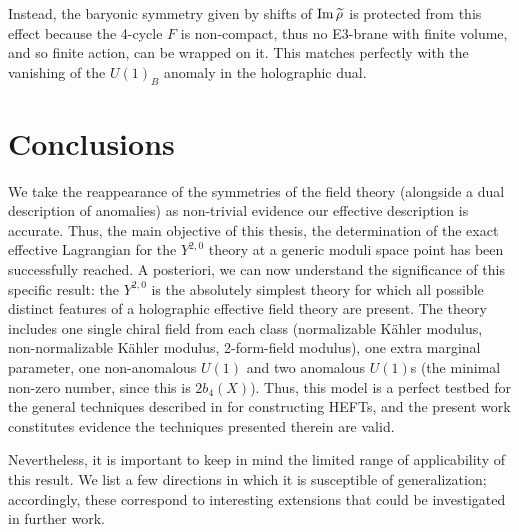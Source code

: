 Instead, the baryonic symmetry given by shifts of $\operatorname{Im}\widetilde{\rho}$ is protected from this effect because the 4-cycle $F$ is non-compact, thus no E3-brane with finite volume, and so finite action, can be wrapped on it. This matches perfectly with the vanishing of the $U(1)_B$ anomaly in the holographic dual.

\section{Conclusions}

We take the reappearance of the symmetries of the field theory (alongside a dual description of anomalies) as non-trivial evidence our effective description is accurate. Thus, the main objective of this thesis, the determination of the exact effective Lagrangian for the $Y^{2,0}$ theory at a generic moduli space point has been successfully reached. A posteriori, we can now understand the significance of this specific result: the $Y^{2,0}$ is the absolutely simplest theory for which all possible distinct features of a holographic effective field theory are present. The theory includes one single chiral field from each class (normalizable K\"ahler modulus, non-normalizable K\"ahler modulus, 2-form-field modulus), one extra marginal parameter, one non-anomalous $U(1)$ and two anomalous $U(1)$s (the minimal non-zero number, since this is $2b_4(X)$). Thus, this model is a perfect testbed for the general techniques described in \cite{MZ} for constructing HEFTs, and the present work constitutes evidence the techniques presented therein are valid.

Nevertheless, it is important to keep in mind the limited range of applicability of this result. We list a few directions in which it is susceptible of generalization; accordingly, these correspond to interesting extensions that could be investigated in further work.

